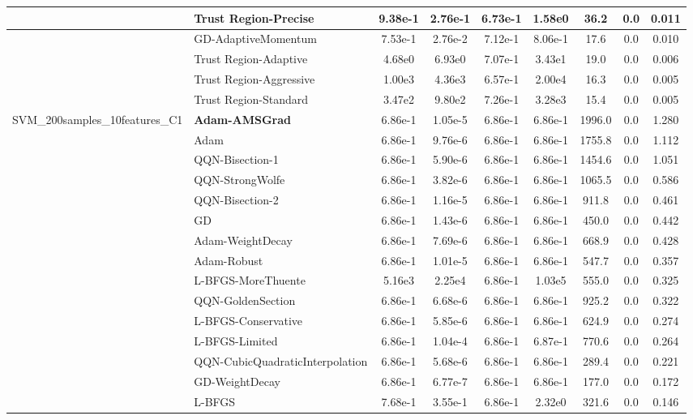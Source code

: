 \documentclass{article}
\begin{document}
\begin{longtable}{|l|l|c|c|c|c|c|c|c|}
\hline
 & Trust Region-Precise & 9.38e-1 & 2.76e-1 & 6.73e-1 & 1.58e0 & 36.2 & 0.0 & 0.011 \\
\hline
 & GD-AdaptiveMomentum & 7.53e-1 & 2.76e-2 & 7.12e-1 & 8.06e-1 & 17.6 & 0.0 & 0.010 \\
\hline
 & Trust Region-Adaptive & 4.68e0 & 6.93e0 & 7.07e-1 & 3.43e1 & 19.0 & 0.0 & 0.006 \\
\hline
 & Trust Region-Aggressive & 1.00e3 & 4.36e3 & 6.57e-1 & 2.00e4 & 16.3 & 0.0 & 0.005 \\
\hline
 & Trust Region-Standard & 3.47e2 & 9.80e2 & 7.26e-1 & 3.28e3 & 15.4 & 0.0 & 0.005 \\
SVM\_200samples\_10features\_C1 & \textbf{Adam-AMSGrad} & 6.86e-1 & 1.05e-5 & 6.86e-1 & 6.86e-1 & 1996.0 & 0.0 & 1.280 \\
\hline
 & Adam & 6.86e-1 & 9.76e-6 & 6.86e-1 & 6.86e-1 & 1755.8 & 0.0 & 1.112 \\
\hline
 & QQN-Bisection-1 & 6.86e-1 & 5.90e-6 & 6.86e-1 & 6.86e-1 & 1454.6 & 0.0 & 1.051 \\
\hline
 & QQN-StrongWolfe & 6.86e-1 & 3.82e-6 & 6.86e-1 & 6.86e-1 & 1065.5 & 0.0 & 0.586 \\
\hline
 & QQN-Bisection-2 & 6.86e-1 & 1.16e-5 & 6.86e-1 & 6.86e-1 & 911.8 & 0.0 & 0.461 \\
\hline
 & GD & 6.86e-1 & 1.43e-6 & 6.86e-1 & 6.86e-1 & 450.0 & 0.0 & 0.442 \\
\hline
 & Adam-WeightDecay & 6.86e-1 & 7.69e-6 & 6.86e-1 & 6.86e-1 & 668.9 & 0.0 & 0.428 \\
\hline
 & Adam-Robust & 6.86e-1 & 1.01e-5 & 6.86e-1 & 6.86e-1 & 547.7 & 0.0 & 0.357 \\
\hline
 & L-BFGS-MoreThuente & 5.16e3 & 2.25e4 & 6.86e-1 & 1.03e5 & 555.0 & 0.0 & 0.325 \\
\hline
 & QQN-GoldenSection & 6.86e-1 & 6.68e-6 & 6.86e-1 & 6.86e-1 & 925.2 & 0.0 & 0.322 \\
\hline
 & L-BFGS-Conservative & 6.86e-1 & 5.85e-6 & 6.86e-1 & 6.86e-1 & 624.9 & 0.0 & 0.274 \\
\hline
 & L-BFGS-Limited & 6.86e-1 & 1.04e-4 & 6.86e-1 & 6.87e-1 & 770.6 & 0.0 & 0.264 \\
\hline
 & QQN-CubicQuadraticInterpolation & 6.86e-1 & 5.68e-6 & 6.86e-1 & 6.86e-1 & 289.4 & 0.0 & 0.221 \\
\hline
 & GD-WeightDecay & 6.86e-1 & 6.77e-7 & 6.86e-1 & 6.86e-1 & 177.0 & 0.0 & 0.172 \\
\hline
 & L-BFGS & 7.68e-1 & 3.55e-1 & 6.86e-1 & 2.32e0 & 321.6 & 0.0 & 0.146 \\

\end{longtable}
\end{document}
